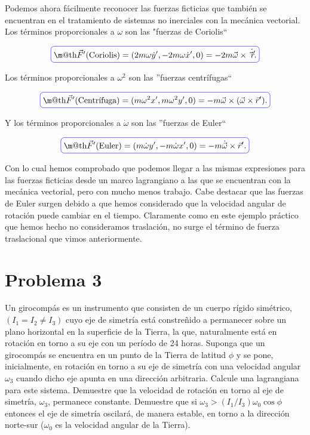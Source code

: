 \documentclass[a4paper,10pt]{article}
\makeatletter
\numberwithin{equation}{section}
\newcommand*{\boxcolor}{blue}
\renewcommand{\boxed}[1]{\textcolor{\boxcolor}{%
\tikz[baseline={([yshift=-1ex]current bounding box.center)}] \node [rectangle, minimum width=1ex,rounded corners,draw] {\normalcolor\m@th$\displaystyle#1$};}}
\makeatother
\begin{document}
Podemos ahora fácilmente reconocer las fuerzas ficticias que también se encuentran en 
el tratamiento de sistemas no inerciales con la mecánica vectorial. Los términos 
proporcionales a $\omega$ son las "fuerzas de Coriolis``

\begin{equation}
\boxed{ \vec{F}' \text{(Coriolis)} = (2m\omega\dot{y}', -2m\omega\dot{x}', 0) = -2m\vec{\omega} \times \dot{\vec{r}'}.}
\end{equation}

Los términos proporcionales a $\omega^2$ son las ''fuerzas centrífugas`` 

\begin{equation}
 \boxed{\vec{F}' \text{(Centrífuga)} = ( m \omega^2 x', m\omega^2 y', 0) = - m \vec{\omega} \times (\vec{\omega} \times \vec{r}').}
\end{equation}

Y los términos proporcionales a $\dot{\omega}$ son las ''fuerzas de Euler``

\begin{equation}
 \boxed{\vec{F}' \text{(Euler)} = (m\dot{\omega}y', -m\dot{\omega}x', 0 ) = - m \dot{\vec{\omega}} \times \vec{r}'.}
\end{equation}

Con lo cual hemos comprobado que podemos llegar a las mismas expresiones para las fuerzas 
ficticias desde un marco lagrangiano a las que se encuentran con la mecánica vectorial, pero 
con mucho menos trabajo. Cabe destacar que las fuerzas de Euler surgen debido a que 
hemos considerado que la velocidad angular de rotación puede cambiar en el tiempo. Claramente 
como en este ejemplo práctico que hemos hecho no consideramos traslación, no surge 
el término de fuerza traslacional que vimos anteriormente.


\section{Problema 3}

Un girocompás es un instrumento que consisten de un cuerpo rígido simétrico, 
$(I_1 = I_2 \ne I_3)$ cuyo eje de simetría está constreñido a permanecer sobre 
un plano horizontal en la superficie de la Tierra, la que, naturalmente está en 
rotación en torno a su eje con un período de 24 horas. Suponga que un girocompás 
se encuentra en un punto de la Tierra de latitud $\phi$ y se pone, inicialmente, 
en rotación en torno a su eje de simetría con una velocidad angular $\omega_3$ cuando 
dicho eje apunta en una dirección arbitraria. Calcule una lagrangiana para este 
sistema. Demuestre que la velocidad de rotación en torno al eje de simetría, $\omega_3$,
permanece constante. Demuestre que si $\omega_3 > (I_1/I_3)\omega_0\cos{\phi}$ entonces 
el eje de simetría oscilará, de manera estable, en torno a la dirección norte-sur 
($\omega_0$ es la velocidad angular de la Tierra).
\end{document}
